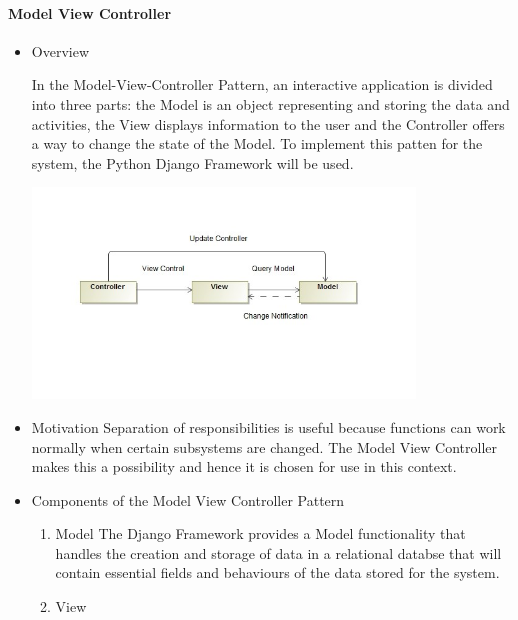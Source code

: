 \documentclass{article}
\begin{document}
			\paragraph{Model View Controller}
				\begin{itemize}
\item{Overview}

In the Model-View-Controller Pattern, an interactive application is divided into three parts: the Model is an object representing and storing the data and activities, the View displays information to the user and the Controller offers a way to change the state of the Model. To implement this patten for the system, the Python Django Framework will be used.

\begin{minipage}{\linewidth} 
\centering
\includegraphics[width=4in]{../Diagrams/ArchitecturalPatterns/ModelViewController.jpg}
\end{minipage}

\item{Motivation}
\newline
Separation of responsibilities is useful because functions can work normally when certain subsystems are changed. The Model View Controller makes this a possibility and hence it is chosen for use in this context. 

\item{Components of the Model View Controller Pattern}
\begin{enumerate}
\item{Model}
\newline
The Django Framework provides a Model functionality that handles the creation and storage of data in a relational databse that will contain essential fields and behaviours of the data stored for the system.
\newline

\item{View}


\end{enumerate}
\end{itemize}
\end{document}

